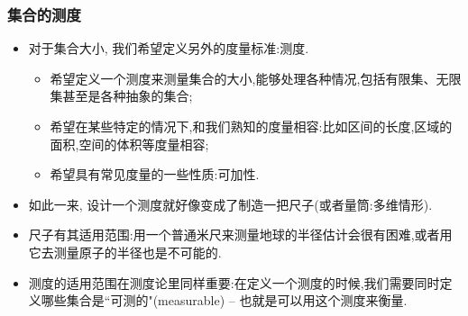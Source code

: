 \documentclass[Prob-All.tex]{subfiles}
\begin{document}
\begin{frame}
	\frametitle{集合的测度}
	\begin{itemize}[<+-|alert@+>]
		\item 对于集合大小, 我们希望定义另外的度量标准:测度.
		\begin{itemize}[<+-|alert@+>]
			\item 希望定义一个测度来测量集合的大小,能够处理各种情况,包括有限集、无限集甚至是各种抽象的集合;
			\item 希望在某些特定的情况下,和我们熟知的度量相容:比如区间的长度,区域的面积,空间的体积等度量相容;
			\item 希望具有常见度量的一些性质:可加性.
		\end{itemize}
		\item 如此一来, 设计一个测度就好像变成了制造一把尺子(或者量筒:多维情形).
		\item 尺子有其适用范围:用一个普通米尺来测量地球的半径估计会很有困难,或者用它去测量原子的半径也是不可能的.
		\item 测度的适用范围在测度论里同样重要:在定义一个测度的时候,我们需要同时定义哪些集合是“可测的"({\rm measurable}) -- 也就是可以用这个测度来衡量.
	\end{itemize}
\end{frame}
\end{document}
